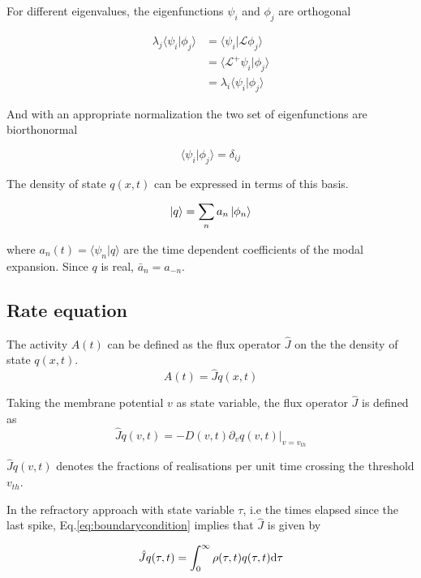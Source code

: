 \documentclass[12pt,twoside]{report}
\def \dd  {{\rm d}}
\begin{document}
For different eigenvalues, the eigenfunctions $\psi_i$ and $\phi_j$ are orthogonal

\begin{align}
\lambda_j\langle\psi_i|\phi_j\rangle
&=\langle\psi_i|\mathcal{L}\phi_j\rangle \nonumber \\
&=\langle\mathcal{L}^+\psi_i|\phi_j\rangle  \nonumber \\
&=\lambda_i\langle\psi_i|\phi_j\rangle \label{eq:lorthogonal}
\end{align}

And with an appropriate normalization the two set of eigenfunctions are biorthonormal

\begin{equation}
\label{eq:dij}
\langle\psi_i|\phi_j\rangle=\delta_{ij}
\end{equation}

The density of state $q(x,t)$ can be expressed in terms of this basis. 

\begin{equation}
\label{eq:p}
\ket{q}=\sum_na_n\ket{\phi_n}
\end{equation}

where $a_n(t)=\langle \psi_n | q\rangle$ are the time dependent coefficients of the modal expansion. Since $q$ is real, $\bar{a}_n=a_{-n}$.


\subsection{Rate equation}

The activity $A(t)$ can be defined as the flux operator $\hat{J}$ on the the density of state $q(x,t)$. 
\begin{equation}
\label{eq:AJq}
A(t)=\hat{J}q(x,t)
\end{equation}

Taking the membrane potential $v$ as state variable, the flux operator $\hat{J}$ is defined as
\begin{equation}
\hat{J}q(v,t)=-D(v,t)\partial_v q(v,t)|_{v=v_{th}}
\end{equation}

$\hat{J}q(v,t)$ denotes the fractions of realisations per unit time crossing the threshold $v_{th}$.

In the refractory approach with state variable $\tau$, i.e the times elapsed since the last spike, Eq.\eqref{eq:boundarycondition} implies that $\hat{J}$ is given by

\begin{equation}
\hat{J}q(\tau,t)=\int_0^\infty \rho(\tau,t)q(\tau,t)\dd \tau
\end{equation}
\end{document}
